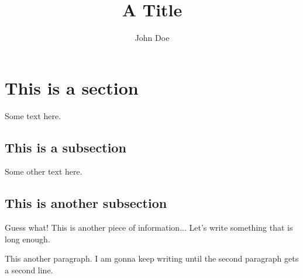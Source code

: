 \documentclass{article}
\title{A Title}
\author{John Doe}
\begin{document}
\maketitle

\section{This is a section}

Some text here.

\subsection{This is a subsection}

Some other text here.

\subsection{This is another subsection}

Guess what!
This is another piece of information...
Let's write something that is long enough.

This another paragraph.
I am gonna keep writing until the second paragraph gets a second line.
\end{document}
